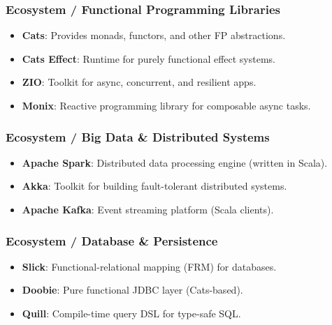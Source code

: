 \documentclass{beamer}
\begin{document}

\begin{frame}
\frametitle{Ecosystem / Functional Programming Libraries }

\begin{itemize}
  \item \textbf{Cats}: Provides monads, functors, and other FP abstractions.
  \item \textbf{Cats Effect}: Runtime for purely functional effect systems.
  \item \textbf{ZIO}: Toolkit for async, concurrent, and resilient apps.
  \item \textbf{Monix}: Reactive programming library for composable async tasks.
\end{itemize}

\end{frame}


\begin{frame}
\frametitle{Ecosystem / Big Data \& Distributed Systems }

\begin{itemize}
  \item \textbf{Apache Spark}: Distributed data processing engine (written in Scala).
  \item \textbf{Akka}: Toolkit for building fault-tolerant distributed systems.
  \item \textbf{Apache Kafka}: Event streaming platform (Scala clients).
\end{itemize}

\end{frame}


\begin{frame}
\frametitle{Ecosystem / Database \& Persistence }
\begin{itemize}
  \item \textbf{Slick}: Functional-relational mapping (FRM) for databases.
  \item \textbf{Doobie}: Pure functional JDBC layer (Cats-based).
  \item \textbf{Quill}: Compile-time query DSL for type-safe SQL.
\end{itemize}
\end{frame}

\end{document}
